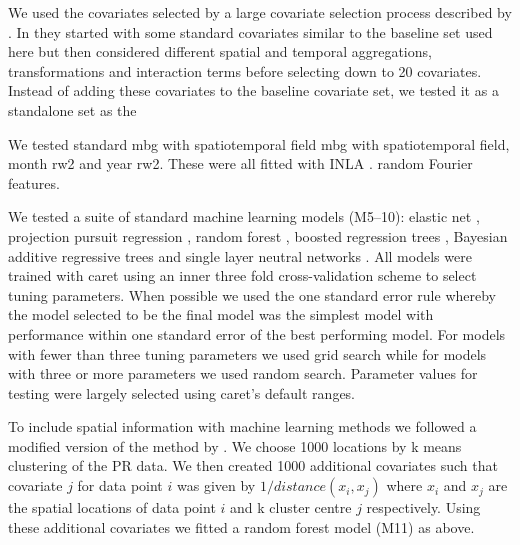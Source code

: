 \documentclass{bmcart}
\begin{document}














We used the covariates selected by a large covariate selection process described by \cite{weiss2005}.
In \cite{weiss2005} they started with some standard covariates similar to the baseline set used here but then considered different spatial and temporal aggregations, transformations and interaction terms before selecting down to 20 covariates.
Instead of adding these covariates to the baseline covariate set, we tested it as a standalone set as the




We tested
standard mbg with spatiotemporal field
mbg with spatiotemporal field, month rw2 and year rw2.
These were all fitted with INLA \cite{INLA}.
random Fourier features.


We tested a suite of standard machine learning models (M5--10): elastic net \cite{}, projection pursuit regression \cite{}, random forest \cite{ranger},  boosted regression trees \cite{xgboost}, Bayesian additive regressive trees \cite{} and single layer neutral networks \cite{nnet}.
All models were trained with caret \cite{caret} using an inner three fold cross-validation scheme to select tuning parameters.
When possible we used the one standard error rule \cite{Brodmann} whereby the model selected to be the final model was the simplest model with performance within one standard error of the best performing model.
For models with fewer than three tuning parameters we used grid search while for models with three or more parameters we used random search.
Parameter values for testing were largely selected using caret's default ranges.


To include spatial information with machine learning methods we followed a modified version of the method by \cite{}.
We choose 1000 locations by k means clustering of the PR data.
We then created 1000 additional covariates such that covariate $j$ for data point $i$ was given by $1 / distance (x_i, x_j)$ where $x_i$ and $x_j$ are the spatial locations of data point $i$ and k cluster centre $j$ respectively.
Using these additional covariates we fitted a random forest model (M11) as above.
\end{document}
